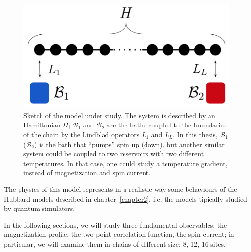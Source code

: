\begin{figure}[H]
    \centering
    \includegraphics[scale=0.6]{Figures/sketch_model.png}
    \captionsetup{width=1.\linewidth}
    \caption{Sketch of the model under study. The system is described by an Hamiltonian $H$; $\mathcal{B}_1$ and $\mathcal{B}_2$ are the baths coupled to the boundaries of the chain by the Lindblad operators $L_1$ and $L_L$. In this thesis, $\mathcal{B}_1$ ($\mathcal{B}_2$) is the bath that ``pumps'' spin up (down), but another similar system could be coupled to two reservoirs with two different temperatures. In that case, one could study a temperature gradient, instead of magnetization and spin current.}
    \label{fig:sketch_model}
\end{figure}


The physics of this model represents in a realistic way some behaviours of the Hubbard models described in chapter~\ref{chapter2}, i.e. the models tipically studied by quantum simulators.

In the following sections, we will study three fundamental observables: the magnetization profile, the two-point correlation function, the spin current; in particular, we will examine them in chains of different size: 8, 12, 16 sites. 

